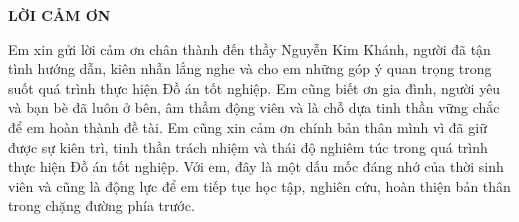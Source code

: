 \documentclass[../DoAn.tex]{subfiles}
\begin{document}
\begin{center}
    \Large{\textbf{LỜI CẢM ƠN}}\\
\end{center}
\vspace{1cm}
Em xin gửi lời cảm ơn chân thành đến thầy Nguyễn Kim Khánh, người đã tận tình hướng dẫn, kiên nhẫn lắng nghe và cho em những góp ý quan trọng trong suốt quá trình thực hiện Đồ án tốt nghiệp. Em cũng biết ơn gia đình, người yêu và bạn bè đã luôn ở bên, âm thầm động viên và là chỗ dựa tinh thần vững chắc để em hoàn thành đề tài. Em cũng xin cảm ơn chính bản thân mình vì đã giữ được sự kiên trì, tinh thần trách nhiệm và thái độ nghiêm túc trong quá trình thực hiện Đồ án tốt nghiệp. Với em, đây là một dấu mốc đáng nhớ của thời sinh viên và cũng là động lực để em tiếp tục học tập, nghiên cứu, hoàn thiện bản thân trong chặng đường phía trước.
\end{document}
